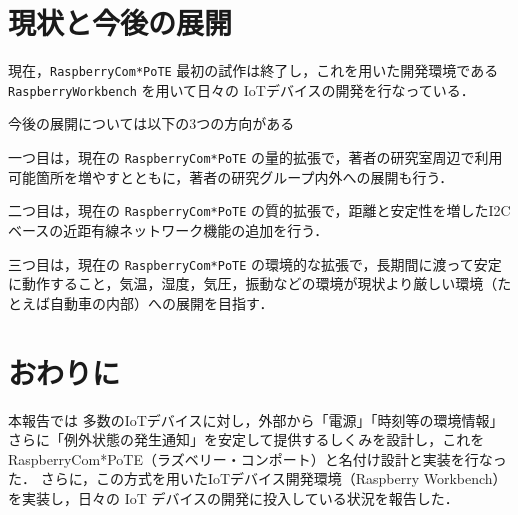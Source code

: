 
\section{現状と今後の展開}

\label{sec:07nextstep}

現在，{\tt Raspberry\-Com*PoTE} 最初の試作は終了し，これを用いた開発環境である {\tt Raspberry\-Workbench} を用いて日々の IoTデバイスの開発を行なっている．


今後の展開については以下の3つの方向がある

一つ目は，現在の {\tt Raspberry\-Com*PoTE} の量的拡張で，著者の研究室周辺で利用可能箇所を増やすとともに，著者の研究グループ内外への展開も行う．


二つ目は，現在の {\tt Raspberry\-Com*PoTE} の質的拡張で，距離と安定性を増したI2Cベースの近距有線ネットワーク機能の追加を行う．


三つ目は，現在の {\tt Raspberry\-Com*PoTE} の環境的な拡張で，長期間に渡って安定に動作すること，気温，湿度，気圧，振動などの環境が現状より厳しい環境（たとえば自動車の内部）への展開を目指す．




\section{おわりに}
\label{sec:07conclusion}

本報告では
多数のIoTデバイスに対し，外部から「電源」「時刻等の環境情報」さらに「例外状態の発生通知」を安定して提供するしくみを設計し，これを RaspberryCom*PoTE（ラズベリー・コンポート）と名付け設計と実装を行なった．
さらに，この方式を用いたIoTデバイス開発環境（Raspberry Workbench）を実装し，日々の IoT デバイスの開発に投入している状況を報告した．


